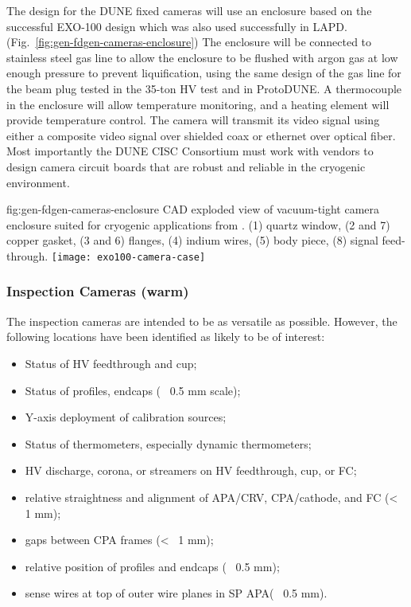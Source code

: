 The design for the DUNE fixed cameras will use an enclosure based on
the successful EXO-100 design\cite{Delaquis:2013hva} which was also
used successfully in
LAPD. (Fig.\ \ref{fig:gen-fdgen-cameras-enclosure}) The enclosure will
be connected to stainless steel gas line to allow the enclosure to be
flushed with argon gas at low enough pressure to prevent
liquification, using the same design of the gas line for the beam plug
tested in the 35-ton HV test and in ProtoDUNE.  A thermocouple in the
enclosure will allow temperature monitoring, and a heating element
will provide temperature control.  The camera will transmit its video
signal using either a composite video signal over shielded coax or
ethernet over optical fiber.  Most importantly the DUNE CISC
Consortium must work with vendors to design camera circuit boards that
are robust and reliable in the cryogenic environment.

\begin{dunefigure}{fig:gen-fdgen-cameras-enclosure}
  {CAD exploded view of vacuum-tight camera enclosure suited for cryogenic applications from \cite{Delaquis:2013hva}.
    (1) quartz window, (2 and 7) copper gasket, (3 and 6) flanges, (4) indium wires, (5) body piece, (8) signal feed-through.
  }
  \texttt{[image: exo100-camera-case]}%
\end{dunefigure}



\subsubsection{Inspection Cameras (warm)}

The inspection cameras are intended to be as versatile as possible.
However, the following locations have been identified as likely
to be of interest:
\begin{itemize}
\item Status of HV feedthrough and cup;
\item Status of profiles, endcaps (~ 0.5 mm scale);
\item Y-axis deployment of calibration sources;
\item Status of thermometers, especially dynamic thermometers;
\item HV discharge, corona, or streamers on HV feedthrough, cup, or FC;
\item relative straightness and alignment of APA/CRV, CPA/cathode, and FC (<~ 1 mm);
\item gaps between CPA frames (<~ 1 mm);
\item relative position of profiles and endcaps (~ 0.5 mm);
\item sense wires at top of outer wire planes in SP APA(~ 0.5 mm).
\end{itemize}

